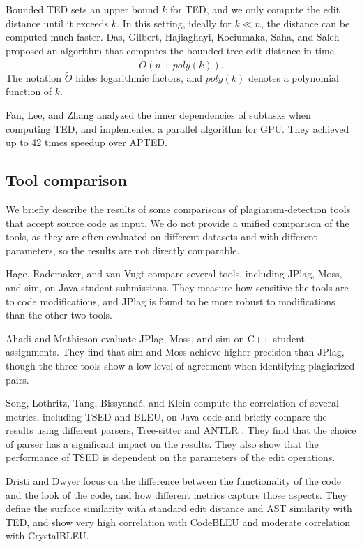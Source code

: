 Bounded TED sets an upper bound $k$ for TED, and we only compute the edit distance until it exceeds $k$.
In this setting, ideally for $k\ll n$, the distance can be computed much faster.
Das, Gilbert, Hajiaghayi, Kociumaka, Saha, and Saleh \cite{das22} proposed an algorithm that computes the bounded tree edit distance in time $$\tilde{O}(n + poly(k)).$$
The notation $\tilde{O}$ hides logarithmic factors, and $poly(k)$ denotes a polynomial function of $k$.

Fan, Lee, and Zhang \cite{xted24} analyzed the inner dependencies of subtasks when computing TED, and implemented a parallel algorithm for GPU.
They achieved up to 42 times speedup over APTED.

\subsection{Tool comparison}

We briefly describe the results of some comparisons of plagiarism-detection tools that accept source code as input.
We do not provide a unified comparison of the tools, as they are often evaluated on different datasets and with different parameters, so the results are not directly comparable.

Hage, Rademaker, and van Vugt \cite{hage11} compare several tools, including JPlag, Moss, and sim, on Java student submissions.
They measure how sensitive the tools are to code modifications, and JPlag is found to be more robust to modifications than the other two tools.

Ahadi and Mathieson \cite{ahadi19} evaluate JPlag, Moss, and sim on C++ student assignments.
They find that sim and Moss achieve higher precision than JPlag, though the three tools show a low level of agreement when identifying plagiarized pairs.

Song, Lothritz, Tang, Bissyandé, and Klein \cite{song24} compute the correlation of several metrics, including TSED and BLEU, on Java code and briefly compare the results using different parsers, Tree-sitter \cite{treesitter} and ANTLR \cite{antlr}.
They find that the choice of parser has a significant impact on the results.
They also show that the performance of TSED is dependent on the parameters of the edit operations.

Dristi and Dwyer \cite{dristi25} focus on the difference between the functionality of the code and the look of the code, and how different metrics capture those aspects.
They define the surface similarity with standard edit distance and AST similarity with TED, and show very high correlation with CodeBLEU and moderate correlation with CrystalBLEU.

